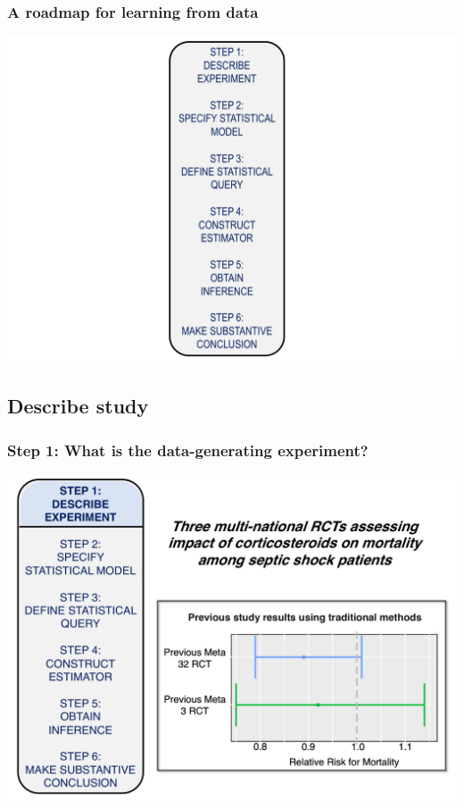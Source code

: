\documentclass[t]{beamer}
\begin{document}
\begin{frame}
  \frametitle{A roadmap for learning from data}
  \vspace{-20pt}
  \begin{center}
  \includegraphics[width = 1.05\textwidth]{figures/roadmap.pdf}
  \end{center}
\end{frame}

\subsection{Describe study}
\begin{frame}
  \frametitle{Step 1: What is the data-generating experiment?}
  \vspace{-20pt}
  \begin{center}
  \includegraphics[width = 1.05\textwidth]{figures/roadmap1_1.pdf}
  \end{center}
\end{frame}
\end{document}
